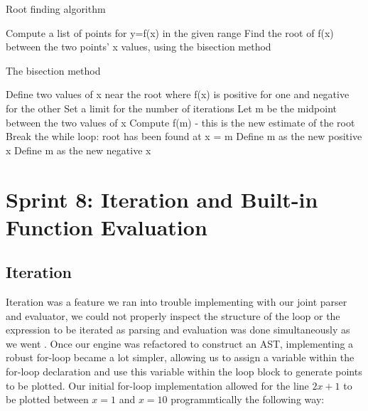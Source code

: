 \documentclass[a4paper, oneside, 11pt]{report}
\begin{document}
\begin{algorithm}[th]
\caption{ Root finding algorithm }
\begin{algorithmic}[1]
\STATE Compute a list of points for y=f(x) in the given range
        \STATE Find the root of f(x) between the two points' x values, using the bisection method
    \ENDIF
\ENDFOR
\end{algorithmic}
\end{algorithm}

\begin{algorithm}[th]
\caption{ The bisection method }
\begin{algorithmic}[1]
\STATE Define two values of x near the root where f(x) is positive for one and negative for the other
\STATE Set a limit for the number of iterations
	\STATE Let m be the midpoint between the two values of x
    \STATE Compute f(m) - this is the new estimate of the root
        \STATE Break the while loop: root has been found at x = m
        \STATE Define m as the new positive x
        \STATE Define m as the new negative x
    \ENDIF
\ENDWHILE
\end{algorithmic}
\end{algorithm}

\section{Sprint 8: Iteration and Built-in Function Evaluation}

\subsection{Iteration}
Iteration was a feature we ran into trouble implementing with our joint parser and evaluator, we could not properly inspect the structure of the loop or the expression to be iterated as parsing and evaluation was done simultaneously as we went . Once our engine was refactored to construct an AST, implementing a robust for-loop became a lot simpler, allowing us to assign a variable within the for-loop declaration and use this variable within the loop block to generate points to be plotted. Our initial for-loop implementation allowed for the line $2x+1$ to be plotted between $x = 1$ and $x = 10$ programmtically the following way:
\end{document}
